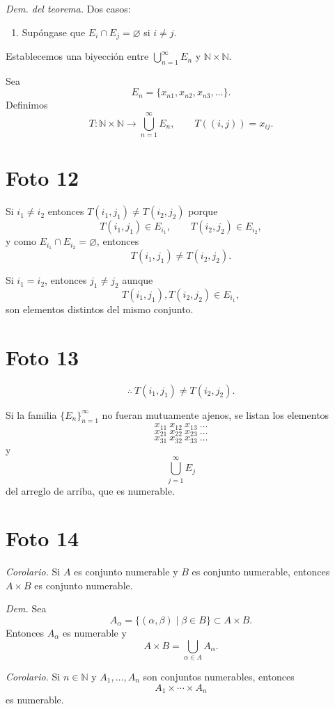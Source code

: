 \documentclass[12pt]{article}
\begin{document}
\textit{Dem. del teorema.}
Dos casos:

\begin{enumerate}[label=\arabic*.]
    \item Sup\'ongase que $E_i\cap E_j=\varnothing$ si $i\neq j$.
\end{enumerate}

Establecemos una biyecci\'on entre $\bigcup_{n=1}^\infty E_n$ y $\mathbb N\times\mathbb N$.

Sea
\[
E_n=\{x_{n1},x_{n2},x_{n3},\dots\}.
\]
Definimos
\[
T:\mathbb N\times\mathbb N\to \bigcup_{n=1}^\infty E_n,\qquad T((i,j))=x_{ij}.
\]

\section*{Foto 12}

Si $i_1\neq i_2$ entonces $T(i_1,j_1)\neq T(i_2,j_2)$ porque
\[
T(i_1,j_1)\in E_{i_1},\qquad T(i_2,j_2)\in E_{i_2},
\]
y como $E_{i_1}\cap E_{i_2}=\varnothing$, entonces
\[
T(i_1,j_1)\neq T(i_2,j_2).
\]

Si $i_1=i_2$, entonces $j_1\neq j_2$ aunque
\[
T(i_1,j_1),T(i_2,j_2)\in E_{i_1},
\]
son elementos distintos del mismo conjunto.

\section*{Foto 13}

\[
\therefore\ T(i_1,j_1)\neq T(i_2,j_2).
\]

Si la familia $\{E_n\}_{n=1}^\infty$ no fueran mutuamente ajenos, se listan los elementos
\[
x_{11}\ x_{12}\ x_{13}\ \dots
\]
\[
x_{21}\ x_{22}\ x_{23}\ \dots
\]
\[
x_{31}\ x_{32}\ x_{33}\ \dots
\]
y
\[
\bigcup_{j=1}^\infty E_j
\]
del arreglo de arriba, que es numerable.

\section*{Foto 14}

\textit{Corolario.} Si $A$ es conjunto numerable y $B$ es conjunto numerable, entonces $A\times B$ es conjunto numerable.

\textit{Dem.}
Sea
\[
A_\alpha=\{(\alpha,\beta)\mid \beta\in B\}\subset A\times B.
\]
Entonces $A_\alpha$ es numerable y
\[
A\times B=\bigcup_{\alpha\in A}A_\alpha.
\]

\textit{Corolario.} Si $n\in\mathbb N$ y $A_1,\dots,A_n$ son conjuntos numerables, entonces
\[
A_1\times\cdots\times A_n
\]
es numerable.
\end{document}
